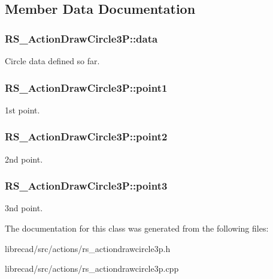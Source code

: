 \subsection{Member Data Documentation}
\hypertarget{classRS__ActionDrawCircle3P_a185bddf75b4906b8c1ef334de16b67d3}{
\subsubsection[{data}]{ R\-S\-\_\-\-Action\-Draw\-Circle3\-P\-::data\hspace{0.3cm}{\ttfamily [protected]}}}\label{classRS__ActionDrawCircle3P_a185bddf75b4906b8c1ef334de16b67d3}
Circle data defined so far. \hypertarget{classRS__ActionDrawCircle3P_a9d6af79c4de0259d07c4ca1160bddc45}{
\subsubsection[{point1}]{ R\-S\-\_\-\-Action\-Draw\-Circle3\-P\-::point1\hspace{0.3cm}{\ttfamily [protected]}}}\label{classRS__ActionDrawCircle3P_a9d6af79c4de0259d07c4ca1160bddc45}
1st point. \hypertarget{classRS__ActionDrawCircle3P_adcba0ba478436eafc1ddb5feb5a2eda1}{
\subsubsection[{point2}]{ R\-S\-\_\-\-Action\-Draw\-Circle3\-P\-::point2\hspace{0.3cm}{\ttfamily [protected]}}}\label{classRS__ActionDrawCircle3P_adcba0ba478436eafc1ddb5feb5a2eda1}
2nd point. \hypertarget{classRS__ActionDrawCircle3P_ab98aed3b878171e66a3e9e27452910c6}{
\subsubsection[{point3}]{ R\-S\-\_\-\-Action\-Draw\-Circle3\-P\-::point3\hspace{0.3cm}{\ttfamily [protected]}}}\label{classRS__ActionDrawCircle3P_ab98aed3b878171e66a3e9e27452910c6}
3nd point. 

The documentation for this class was generated from the following files\-:\begin{DoxyCompactItemize}
\item 
librecad/src/actions/rs\-\_\-actiondrawcircle3p.\-h\item 
librecad/src/actions/rs\-\_\-actiondrawcircle3p.\-cpp\end{DoxyCompactItemize}
